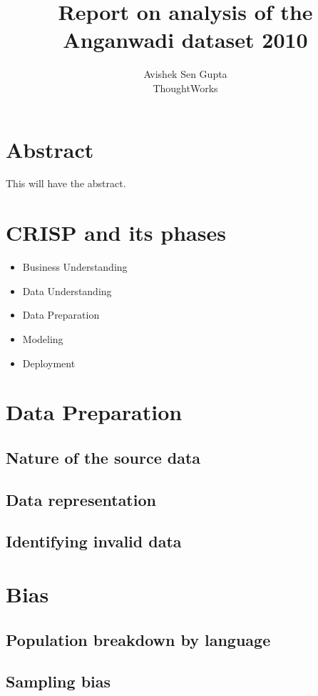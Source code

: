 \documentclass[12pt]{article}
\begin{document}
\title{Report on analysis of the Anganwadi dataset 2010} 
\author{Avishek Sen Gupta\\ThoughtWorks}
\maketitle
\newpage
\section{Abstract}
This will have the abstract.
\section{CRISP and its phases}
\begin{itemize}
\item Business Understanding
\item Data Understanding
\item Data Preparation
\item Modeling
\item Deployment
\end{itemize}

\newpage
\section{Data Preparation}
\subsection{Nature of the source data}
\subsection{Data representation}
\subsection{Identifying invalid data}

\newpage
\section{Bias}
\subsection{Population breakdown by language}
\subsection{Sampling bias}
\end{document}

